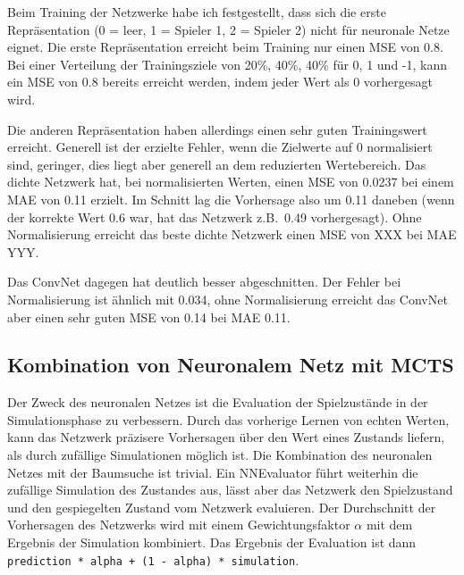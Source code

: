 
Beim Training der Netzwerke habe ich festgestellt, dass sich die erste Repräsentation (0 = leer, 1 = Spieler 1, 2 = Spieler 2) nicht für neuronale Netze eignet.
Die erste Repräsentation erreicht beim Training nur einen MSE von 0.8.
Bei einer Verteilung der Trainingsziele von 20\%, 40\%, 40\% für 0, 1 und -1, kann ein MSE von 0.8 bereits erreicht werden, indem jeder Wert als 0 vorhergesagt wird.

Die anderen Repräsentation haben allerdings einen sehr guten Trainingswert erreicht.
Generell ist der erzielte Fehler, wenn die Zielwerte auf 0 normalisiert sind, geringer, dies liegt aber generell an dem reduzierten Wertebereich.
Das dichte Netzwerk hat, bei normalisierten Werten, einen MSE von 0.0237 bei einem MAE von 0.11 erzielt.
Im Schnitt lag die Vorhersage also um 0.11 daneben (wenn der korrekte Wert 0.6 war, hat das Netzwerk z.B.\ 0.49 vorhergesagt).
Ohne Normalisierung erreicht das beste dichte Netzwerk einen MSE von XXX bei MAE YYY.

Das ConvNet dagegen hat deutlich besser abgeschnitten.
Der Fehler bei Normalisierung ist ähnlich mit 0.034, ohne Normalisierung erreicht das ConvNet aber einen sehr guten MSE von 0.14 bei MAE 0.11.

\subsection{Kombination von Neuronalem Netz mit MCTS}
Der Zweck des neuronalen Netzes ist die Evaluation der Spielzustände in der Simulationsphase zu verbessern.
Durch das vorherige Lernen von echten Werten, kann das Netzwerk präzisere Vorhersagen über den Wert eines Zustands liefern, als durch zufällige Simulationen möglich ist.
Die Kombination des neuronalen Netzes mit der Baumsuche ist trivial.
Ein NNEvaluator führt weiterhin die zufällige Simulation des Zustandes aus, lässt aber das Netzwerk den Spielzustand und den gespiegelten Zustand vom Netzwerk evaluieren.
Der Durchschnitt der Vorhersagen des Netzwerks wird mit einem Gewichtungsfaktor $\alpha$ mit dem Ergebnis der Simulation kombiniert.
Das Ergebnis der Evaluation ist dann \texttt{prediction * alpha + (1 - alpha) * simulation}.

